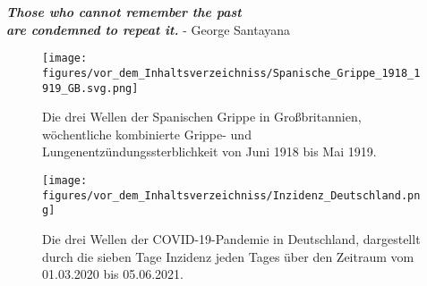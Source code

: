 \vspace*{15pt}
\begin{center}
    \huge{\textbf{
    \textit{Those who cannot remember the past\\ are condemned to repeat it.}}}
    \large{- George Santayana \autocite{history-quoteSantayana}}
\end{center}
\vspace*{65pt}
\begin{figure}[h]
    \centering
    \texttt{[image: figures/vor\_dem\_Inhaltsverzeichniss/Spanische\_Grippe\_1918\_1919\_GB.svg.png]}
    \caption{Die drei Wellen der \glqq{}Spanischen Grippe\grqq{} in Großbritannien, wöchentliche kombinierte Grippe- und Lungenentzündungssterblichkeit von Juni 1918 bis Mai 1919. \autocite{spanischflu}}
    \label{fig:spanishflu}
\end{figure}

\begin{figure}[h]
    \centering
    \texttt{[image: figures/vor\_dem\_Inhaltsverzeichniss/Inzidenz\_Deutschland.png]}
    \caption{Die drei Wellen der COVID-19-Pandemie in Deutschland, dargestellt durch die sieben Tage Inzidenz jeden Tages über den Zeitraum vom 01.03.2020 bis 05.06.2021.}
    \label{fig:germany_incidence}
\end{figure}